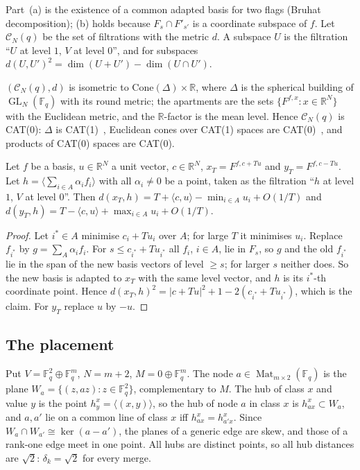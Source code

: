 \documentclass[10pt]{amsart}
\theoremstyle{plain}
\theoremstyle{definition}
\theoremstyle{remark}
\numberwithin{equation}{section}
\newcommand{\F}{\mathbb{F}}
\newcommand{\R}{\mathbb{R}}
\newcommand{\cC}{\mathcal{C}}
\newcommand{\Mat}{\operatorname{Mat}}
\newcommand{\GL}{\operatorname{GL}}
\newcommand{\stP}{proved here}
\begin{document}
Part~(a) is the existence of a common adapted basis for two flags (Bruhat decomposition); (b) holds
because $F_s\cap F'_{s'}$ is a coordinate subspace of $f$. Let $\cC_N(q)$ be the set of filtrations
with the metric $d$. A subspace $U$ is the filtration ``$U$ at level $1$, $V$ at level $0$'', and for
subspaces $d(U,U')^2=\dim(U+U')-\dim(U\cap U')$.

\begin{fact}\label{fact:cat}
$(\cC_N(q),d)$ is isometric to $\mathrm{Cone}(\Delta)\times\R$, where $\Delta$ is the spherical building
of $\GL_N(\F_q)$ with its round metric; the apartments are the sets $\{F^{f,x}:x\in\R^N\}$ with the
Euclidean metric, and the $\R$-factor is the mean level. Hence $\cC_N(q)$ is CAT(0): $\Delta$ is
CAT(1)~\cite[Thm.~II.10A.4]{BH99}, Euclidean cones over CAT(1) spaces are CAT(0)~\cite[Thm.~II.3.14]{BH99},
and products of CAT(0) spaces are CAT(0).
\end{fact}

\begin{lemma}[far legs at point hubs; \stP]\label{lem:farleg}
Let $f$ be a basis, $u\in\R^N$ a unit vector, $c\in\R^N$, $x_T=F^{f,c+Tu}$ and $y_T=F^{f,c-Tu}$. Let
$h=\langle\sum_{i\in A}\alpha_if_i\rangle$ with all $\alpha_i\ne0$ be a point, taken as the filtration
``$h$ at level $1$, $V$ at level $0$''. Then $d(x_T,h)=T+\langle c,u\rangle-\min_{i\in A}u_i+O(1/T)$ and
$d(y_T,h)=T-\langle c,u\rangle+\max_{i\in A}u_i+O(1/T)$.
\end{lemma}

\begin{proof}
Let $i^*\in A$ minimise $c_i+Tu_i$ over $A$; for large $T$ it minimises $u_i$. Replace $f_{i^*}$ by
$g=\sum_{A}\alpha_if_i$. For $s\le c_{i^*}+Tu_{i^*}$ all $f_i$, $i\in A$, lie in $F_s$, so $g$ and the
old $f_{i^*}$ lie in the span of the new basis vectors of level $\ge s$; for larger $s$ neither does.
So the new basis is adapted to $x_T$ with the same level vector, and $h$ is its $i^*$-th coordinate
point. Hence $d(x_T,h)^2=|c+Tu|^2+1-2(c_{i^*}+Tu_{i^*})$, which is the claim. For $y_T$ replace $u$ by
$-u$.
\end{proof}

\subsection{The placement}\label{sec:placement}
Put $V=\F_q^2\oplus\F_q^m$, $N=m+2$, $M=0\oplus\F_q^m$. The node $a\in\Mat_{m\times2}(\F_q)$ is the plane
$W_a=\{(z,az):z\in\F_q^2\}$, complementary to $M$. The hub of class $x$ and value $y$ is the point
$h^x_y=\langle(x,y)\rangle$, so the hub of node $a$ in class $x$ is $h^x_{ax}\subset W_a$, and $a,a'$ lie
on a common line of class $x$ iff $h^x_{ax}=h^x_{a'x}$. Since $W_a\cap W_{a'}\cong\ker(a-a')$, the planes
of a generic edge are skew, and those of a rank-one edge meet in one point. All hubs are distinct
points, so all hub distances are $\sqrt2$: $\delta_k=\sqrt2$ for every merge.
\end{document}
